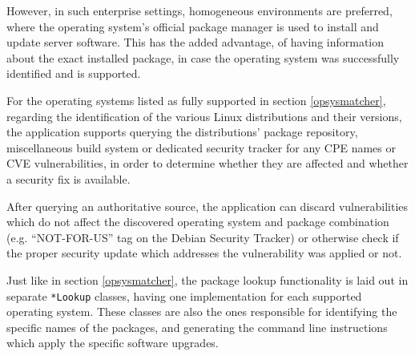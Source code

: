 \documentclass[a4paper,12pt]{article}
\begin{document}
	However, in such enterprise settings, homogeneous environments are preferred, where the operating system's official package manager is used to install and update server software. This has the added advantage, of having information about the exact installed package, in case the operating system was successfully identified and is supported.
	
	For the operating systems listed as fully supported in section \ref{opsysmatcher}, regarding the identification of the various Linux distributions and their versions, the application supports querying the distributions' package repository, miscellaneous build system or dedicated security tracker for any CPE names or CVE vulnerabilities, in order to determine whether they are affected and whether a security fix is available.
	
	After querying an authoritative source, the application can discard vulnerabilities which do not affect the discovered operating system and package combination (e.g. ``NOT-FOR-US'' tag on the Debian Security Tracker) or otherwise check if the proper security update which addresses the vulnerability was applied or not.
	
	Just like in section \ref{opsysmatcher}, the package lookup functionality is laid out in separate \texttt{*Lookup} classes, having one implementation for each supported operating system. These classes are also the ones responsible for identifying the specific names of the packages, and generating the command line instructions which apply the specific software upgrades.
	
\end{document}
